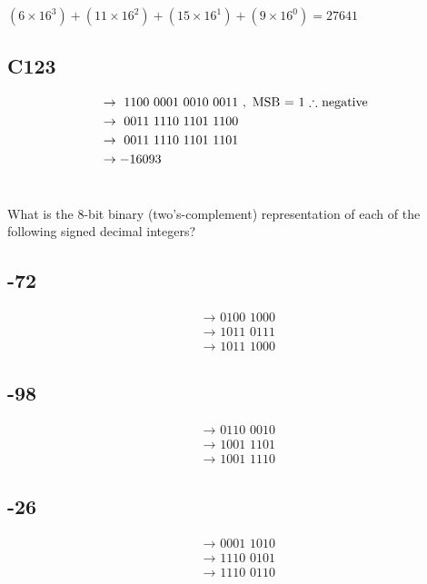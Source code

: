 \documentclass{article}
\begin{document}
$ (6 \times 16^{3}) + (11 \times 16^{2}) + (15 \times 16^{1}) + (9 \times 16^{0}) = 27641 $

\subsection{C123}

\begin{align*}
	& \rightarrow \text{ 1100 0001 0010 0011 }, \text{ MSB = 1 $ \therefore $ negative } \\
	& \rightarrow \text{ 0011 1110 1101 1100 } \\
	& \rightarrow \text{ 0011 1110 1101 1101 } \\
	& \rightarrow -16093
\end{align*}

\section{}
What is the 8-bit binary (two’s-complement) representation of each of the following signed decimal integers?

\subsection{-72}

\begin{align*}
	& \rightarrow \text{ 0100 1000 } \\
	& \rightarrow \text{ 1011 0111 } \\
	& \rightarrow \text{ 1011 1000 }
\end{align*}

\subsection{-98}

\begin{align*}
	& \rightarrow \text{ 0110 0010 } \\
	& \rightarrow \text{ 1001 1101 } \\
	& \rightarrow \text{ 1001 1110 }
\end{align*}

\subsection{-26}

\begin{align*}
	& \rightarrow \text{ 0001 1010 } \\
	& \rightarrow \text{ 1110 0101 } \\
	& \rightarrow \text{ 1110 0110 }
\end{align*}
\end{document}
